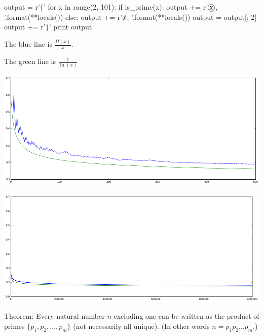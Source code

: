 \item 
\newcommand*\circled[1]{
\tikz[baseline=(char.base)]{
\node[shape=circle,draw,inner sep=1pt] (char) {#1};
}
}

\begin{python}[tools.py]
output = r'$\{$'
for x in range(2, 101):
    if is_prime(x):
        output += r'$\circled{{{x}}}$, '.format(**locals())
    else:
        output += r'$\cancel{{{x}}}$, '.format(**locals())
output = output[:-2]
output += r'$\}$'
print output
\end{python}

\item 
The blue line is $\frac{\Pi(x)}{x}$.

The green line is $\frac{1}{\ln(x)}$

\includegraphics[width=6in]{primes_small.png}

\includegraphics[width=6in]{primes_large.png}

\item Theorem: Every natural number \(n\) excluding one can be written as the product of primes \(\{p_1, p_2, \dots, p_m\}\) (not necessarily all unique). (In other words \(n = p_1 p_2 \dots p_m\).)

